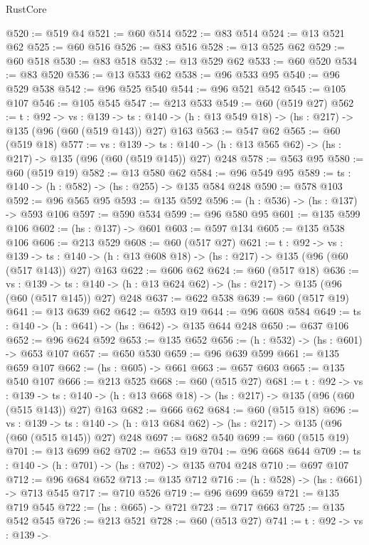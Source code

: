 \begin{lexlean}{RustCore}
\begin{coremodule}
@520 := @519 @4
@521 := @60 @514
@522 := @83 @514
@524 := @13 @521 @62
@525 := @60 @516
@526 := @83 @516
@528 := @13 @525 @62
@529 := @60 @518
@530 := @83 @518
@532 := @13 @529 @62
@533 := @60 @520
@534 := @83 @520
@536 := @13 @533 @62
@538 := @96 @533 @95
@540 := @96 @529 @538
@542 := @96 @525 @540
@544 := @96 @521 @542
@545 := @105 @107
@546 := @105 @545
@547 := @213 @533
@549 := @60 (@519 @27)
@562 := {t : @92} ->
  {vs : @139} ->
  {ts : @140} -> (h : @13 @549 @18) -> (hs : @217) -> @135 (@96 (@60 (@519 @143)) @27) @163
@563 := @547 @62
@565 := @60 (@519 @18)
@577 := {vs : @139} ->
  {ts : @140} -> (h : @13 @565 @62) -> (hs : @217) -> @135 (@96 (@60 (@519 @145)) @27) @248
@578 := @563 @95
@580 := @60 (@519 @19)
@582 := @13 @580 @62
@584 := @96 @549 @95
@589 := {ts : @140} -> (h : @582) -> (hs : @255) -> @135 @584 @248
@590 := @578 @103
@592 := @96 @565 @95
@593 := @135 @592
@596 := (h : @536) -> (hs : @137) -> @593 @106
@597 := @590 @534
@599 := @96 @580 @95
@601 := @135 @599 @106
@602 := (hs : @137) -> @601
@603 := @597 @134
@605 := @135 @538 @106
@606 := @213 @529
@608 := @60 (@517 @27)
@621 := {t : @92} ->
  {vs : @139} ->
  {ts : @140} -> (h : @13 @608 @18) -> (hs : @217) -> @135 (@96 (@60 (@517 @143)) @27) @163
@622 := @606 @62
@624 := @60 (@517 @18)
@636 := {vs : @139} ->
  {ts : @140} -> (h : @13 @624 @62) -> (hs : @217) -> @135 (@96 (@60 (@517 @145)) @27) @248
@637 := @622 @538
@639 := @60 (@517 @19)
@641 := @13 @639 @62
@642 := @593 @19
@644 := @96 @608 @584
@649 := {ts : @140} -> (h : @641) -> (hs : @642) -> @135 @644 @248
@650 := @637 @106
@652 := @96 @624 @592
@653 := @135 @652
@656 := (h : @532) -> (hs : @601) -> @653 @107
@657 := @650 @530
@659 := @96 @639 @599
@661 := @135 @659 @107
@662 := (hs : @605) -> @661
@663 := @657 @603
@665 := @135 @540 @107
@666 := @213 @525
@668 := @60 (@515 @27)
@681 := {t : @92} ->
  {vs : @139} ->
  {ts : @140} -> (h : @13 @668 @18) -> (hs : @217) -> @135 (@96 (@60 (@515 @143)) @27) @163
@682 := @666 @62
@684 := @60 (@515 @18)
@696 := {vs : @139} ->
  {ts : @140} -> (h : @13 @684 @62) -> (hs : @217) -> @135 (@96 (@60 (@515 @145)) @27) @248
@697 := @682 @540
@699 := @60 (@515 @19)
@701 := @13 @699 @62
@702 := @653 @19
@704 := @96 @668 @644
@709 := {ts : @140} -> (h : @701) -> (hs : @702) -> @135 @704 @248
@710 := @697 @107
@712 := @96 @684 @652
@713 := @135 @712
@716 := (h : @528) -> (hs : @661) -> @713 @545
@717 := @710 @526
@719 := @96 @699 @659
@721 := @135 @719 @545
@722 := (hs : @665) -> @721
@723 := @717 @663
@725 := @135 @542 @545
@726 := @213 @521
@728 := @60 (@513 @27)
@741 := {t : @92} ->
  {vs : @139} ->

\end{coremodule}
\end{lexlean}
